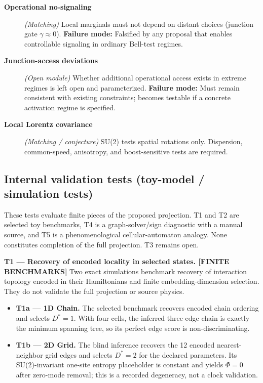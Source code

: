 \documentclass[reprint, amsmath, amssymb, aps, prd]{revtex4-2}
\begin{document}
\begin{description}
    \item[\textbf{Operational no-signaling}] \textit{(Matching)} Local marginals must not depend on distant choices (junction gate $\gamma\approx 0$). \textbf{Failure mode:} Falsified by any proposal that enables controllable signaling in ordinary Bell-test regimes.
    \item[\textbf{Junction-access deviations}] \textit{(Open module)} Whether additional operational access exists in extreme regimes is left open and parameterized. \textbf{Failure mode:} Must remain consistent with existing constraints; becomes testable if a concrete activation regime is specified.
    \item[\textbf{Local Lorentz covariance}] \textit{(Matching / conjecture)} SU(2) tests spatial rotations only. Dispersion, common-speed, anisotropy, and boost-sensitive tests are required.
\end{description}

\subsection{Internal validation tests (toy-model / simulation tests)}
These tests evaluate finite pieces of the proposed projection. T1 and T2 are selected toy benchmarks, T4 is a graph-solver/sign diagnostic with a manual source, and T5 is a phenomenological cellular-automaton analogy. None constitutes completion of the full projection. T3 remains open.

\textbf{T1 --- Recovery of encoded locality in selected states. [FINITE BENCHMARKS]}
Two exact simulations benchmark recovery of interaction topology encoded in their Hamiltonians and finite embedding-dimension selection. They do not validate the full projection or source physics.
\begin{itemize}
    \item \textbf{T1a --- 1D Chain.} The selected benchmark recovers encoded chain ordering and selects $D^*=1$. With four cells, the inferred three-edge chain is exactly the minimum spanning tree, so its perfect edge score is non-discriminating.
    \item \textbf{T1b --- 2D Grid.} The blind inference recovers the 12 encoded nearest-neighbor grid edges and selects $D^*=2$ for the declared parameters. Its SU(2)-invariant one-site entropy placeholder is constant and yields $\Phi=0$ after zero-mode removal; this is a recorded degeneracy, not a clock validation.
\end{itemize}
\end{document}
